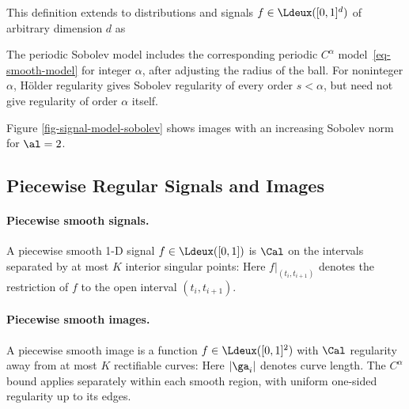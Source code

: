 This definition extends to distributions and signals $f \in \Ldeux([0,1]^d)$ of arbitrary dimension $d$ as

The periodic Sobolev model
includes the corresponding periodic $C^\alpha$ model~\eqref{eq-smooth-model} for integer $\alpha$, after adjusting the radius of the ball. For noninteger $\alpha$, H\"older regularity gives Sobolev regularity of every order $s<\alpha$, but need not give regularity of order $\alpha$ itself.

Figure \ref{fig-signal-model-sobolev} shows images with an increasing Sobolev norm for $\al=2$.



\subsection{Piecewise Regular Signals and Images}

\paragraph{Piecewise smooth signals.}

A piecewise smooth 1-D signal $f \in \Ldeux([0,1])$ is $\Cal$ on the intervals separated by at most $K$ interior singular points:
Here $f|_{(t_i,t_{i+1})}$ denotes the restriction of $f$ to the open interval $(t_i,t_{i+1})$.

\paragraph{Piecewise smooth images.}

A piecewise smooth image is a function $f \in \Ldeux([0,1]^2)$ with $\Cal$ regularity away from at most $K$ rectifiable curves:
Here $|\ga_i|$ denotes curve length. The $C^\alpha$ bound applies separately within each smooth region, with uniform one-sided regularity up to its edges.

